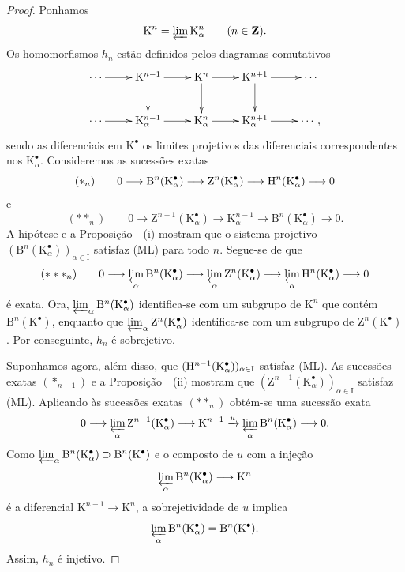 \begin{proof}
Ponhamos
\[
  \mathrm{K}^n=\varprojlim\mathrm{K}^n_\alpha
  \qquad(n\in\mathbf{Z}).
\]
Os homomorfismos $h_n$ estão definidos pelos diagramas comutativos
\[
  \xymatrix{
    \cdots\ar[r]
      & \mathrm{K}^{n-1}\ar[r]\ar[d]
      & \mathrm{K}^n\ar[r]\ar[d]
      & \mathrm{K}^{n+1}\ar[r]\ar[d]
      & \cdots\\
    \cdots\ar[r]
      & \mathrm{K}^{n-1}_\alpha\ar[r]
      & \mathrm{K}^n_\alpha\ar[r]
      & \mathrm{K}^{n+1}_\alpha\ar[r]
      & \cdots,
  }
\]
sendo as diferenciais em $\mathrm{K}^\bullet$ os limites projetivos
das diferenciais correspondentes nos
$\mathrm{K}^\bullet_\alpha$.
Consideremos as sucessões exatas
\[
  (*_n)\qquad
  0\longrightarrow
  \mathrm{B}^n(\mathrm{K}^\bullet_\alpha)
  \longrightarrow
  \mathrm{Z}^n(\mathrm{K}^\bullet_\alpha)
  \longrightarrow
  \mathrm{H}^n(\mathrm{K}^\bullet_\alpha)
  \longrightarrow0
\]
e
\[
  (**_n)\qquad
  0\longrightarrow
  \mathrm{Z}^{n-1}(\mathrm{K}^\bullet_\alpha)
  \longrightarrow
  \mathrm{K}^{n-1}_\alpha
  \longrightarrow
  \mathrm{B}^n(\mathrm{K}^\bullet_\alpha)
  \longrightarrow0.
\]
A hipótese e a Proposição~~(i) mostram que o
sistema projetivo
$(\mathrm{B}^n(\mathrm{K}^\bullet_\alpha))_{\alpha\in\mathrm{I}}$
satisfaz (ML) para todo $n$.
Segue-se de  que
\[
  (***_n)\qquad
  0\longrightarrow
  \varprojlim_\alpha\mathrm{B}^n(\mathrm{K}^\bullet_\alpha)
  \longrightarrow
  \varprojlim_\alpha\mathrm{Z}^n(\mathrm{K}^\bullet_\alpha)
  \longrightarrow
  \varprojlim_\alpha\mathrm{H}^n(\mathrm{K}^\bullet_\alpha)
  \longrightarrow0
\]
é exata.
Ora,
$\varprojlim_\alpha\mathrm{B}^n(\mathrm{K}^\bullet_\alpha)$
identifica-se com um subgrupo de $\mathrm{K}^{n}$ que contém
$\mathrm{B}^n(\mathrm{K}^\bullet)$, enquanto que
$\varprojlim_\alpha\mathrm{Z}^n(\mathrm{K}^\bullet_\alpha)$
identifica-se com um subgrupo de $\mathrm{Z}^n(\mathrm{K}^\bullet)$.
Por conseguinte, $h_n$ é sobrejetivo.

Suponhamos agora, além disso, que
$(\mathrm{H}^{n-1}(\mathrm{K}^\bullet_\alpha))_{\alpha\in\mathrm{I}}$
satisfaz (ML).
As sucessões exatas $(*_{n-1})$ e a
Proposição~~(ii) mostram que
$(\mathrm{Z}^{n-1}(\mathrm{K}^\bullet_\alpha))_{\alpha\in\mathrm{I}}$
satisfaz (ML).
Aplicando  às sucessões exatas $(**_n)$ obtém-se uma
sucessão exata
\[
  0\longrightarrow
  \varprojlim_\alpha
    \mathrm{Z}^{n-1}(\mathrm{K}^\bullet_\alpha)
  \longrightarrow
  \mathrm{K}^{n-1}
  \xrightarrow{u}
  \varprojlim_\alpha
    \mathrm{B}^n(\mathrm{K}^\bullet_\alpha)
  \longrightarrow0.
\]
Como
$\varprojlim_\alpha\mathrm{B}^n(\mathrm{K}^\bullet_\alpha)
\supset\mathrm{B}^n(\mathrm{K}^\bullet)$
e o composto de $u$ com a injeção
\[
  \varprojlim_\alpha\mathrm{B}^n(\mathrm{K}^\bullet_\alpha)
  \longrightarrow\mathrm{K}^n
\]
é a diferencial
$\mathrm{K}^{n-1}\longrightarrow\mathrm{K}^n$, a sobrejetividade de
$u$ implica
\[
  \varprojlim_\alpha\mathrm{B}^n(\mathrm{K}^\bullet_\alpha)
  =
  \mathrm{B}^n(\mathrm{K}^\bullet).
\]
Assim, $h_n$ é injetivo.
\end{proof}

